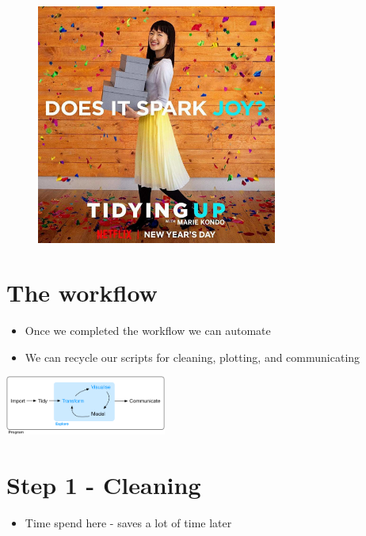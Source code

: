 \documentclass[
  letterpaper,
  DIV=11,
  numbers=noendperiod]{scrreprt}
\providecommand{\tightlist}{%
  \setlength{\itemsep}{0pt}\setlength{\parskip}{0pt}}\usepackage{longtable,booktabs,array}
\begin{document}
\begin{figure}

{\centering \includegraphics[width=3.11in,height=\textheight]{training-materials/presentation/housekeep.jpg}

}

\end{figure}

\hypertarget{the-workflow}{%
\section{The workflow}\label{the-workflow}}

\begin{itemize}
\tightlist
\item
  Once we completed the workflow we can automate
\item
  We can recycle our scripts for cleaning, plotting, and communicating
\end{itemize}

\includegraphics[width=2.08333in,height=\textheight]{training-materials/presentation/workflow.png}

\hypertarget{step-1---cleaning}{%
\section{Step 1 - Cleaning}\label{step-1---cleaning}}

\begin{itemize}
\tightlist
\item
  Time spend here - saves a lot of time later
\end{itemize}
\end{document}
